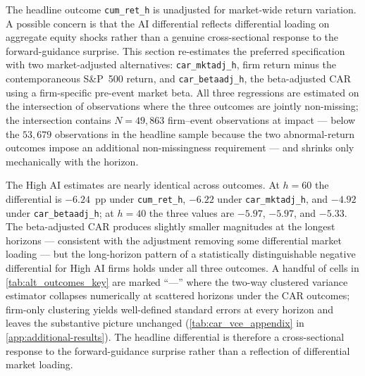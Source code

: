 The headline outcome \texttt{cum\_ret\_h} is unadjusted for market-wide
return variation. A possible concern is that the AI differential
reflects differential loading on aggregate equity shocks rather than
a genuine cross-sectional response to the forward-guidance surprise.
This section re-estimates the preferred specification with two
market-adjusted alternatives: \texttt{car\_mktadj\_h}, firm return
minus the contemporaneous S\&P~500 return, and \texttt{car\_betaadj\_h},
the beta-adjusted CAR using a firm-specific pre-event market beta.
All three regressions are estimated on the intersection of
observations where the three outcomes are jointly non-missing; the
intersection contains $N = 49{,}863$ firm--event observations at
impact --- below the $53{,}679$ observations in the headline sample
because the two abnormal-return outcomes impose an additional
non-missingness requirement --- and shrinks only mechanically with
the horizon.

\begin{table}[htbp]
\centering\small
\caption[Alternative outcomes: key-horizon estimates]{Alternative
outcomes: key-horizon estimates}
\label{tab:alt_outcomes_key}

\end{table}

The High AI estimates are nearly identical across outcomes. At
$h = 60$ the differential is $-6.24$~pp under \texttt{cum\_ret\_h},
$-6.22$ under \texttt{car\_mktadj\_h}, and $-4.92$ under
\texttt{car\_betaadj\_h}; at $h = 40$ the three values are $-5.97$,
$-5.97$, and $-5.33$. The beta-adjusted CAR produces slightly smaller
magnitudes at the longest horizons --- consistent with the
adjustment removing some differential market loading --- but the
long-horizon pattern of a statistically distinguishable negative
differential for High AI firms holds under all three outcomes. A
handful of cells in \cref{tab:alt_outcomes_key} are marked ``---''
where the two-way clustered variance estimator collapses numerically
at scattered horizons under the CAR outcomes; firm-only clustering
yields well-defined standard errors at every horizon and leaves the
substantive picture unchanged
(\cref{tab:car_vce_appendix} in \cref{app:additional-results}). The
headline differential is therefore a cross-sectional response to the
forward-guidance surprise rather than a reflection of differential
market loading.

